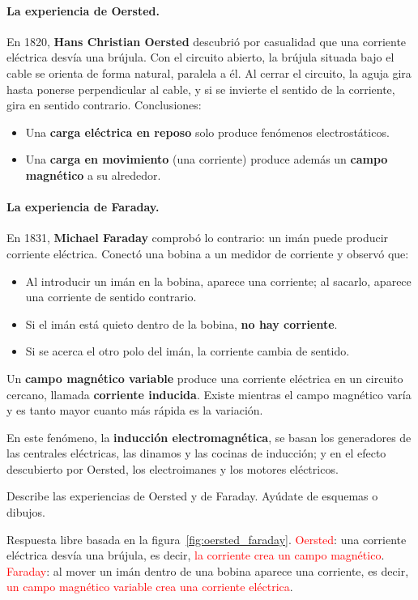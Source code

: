 \paragraph{La experiencia de Oersted.} En 1820, \textbf{Hans Christian Oersted} descubrió por casualidad que una corriente eléctrica desvía una brújula. Con el circuito abierto, la brújula situada bajo el cable se orienta de forma natural, paralela a él. Al cerrar el circuito, la aguja gira hasta ponerse perpendicular al cable, y si se invierte el sentido de la corriente, gira en sentido contrario. Conclusiones:
\begin{itemize}
    \item Una \textbf{carga eléctrica en reposo} solo produce fenómenos electrostáticos.
    \item Una \textbf{carga en movimiento} (una corriente) produce además un \textbf{campo magnético} a su alrededor.
\end{itemize}

\paragraph{La experiencia de Faraday.} En 1831, \textbf{Michael Faraday} comprobó lo contrario: un imán puede producir corriente eléctrica. Conectó una bobina a un medidor de corriente y observó que:
\begin{itemize}
    \item Al introducir un imán en la bobina, aparece una corriente; al sacarlo, aparece una corriente de sentido contrario.
    \item Si el imán está quieto dentro de la bobina, \textbf{no hay corriente}.
    \item Si se acerca el otro polo del imán, la corriente cambia de sentido.
\end{itemize}

\begin{definition}
    Un \textbf{campo magnético variable} produce una corriente eléctrica en un circuito cercano, llamada \textbf{corriente inducida}. Existe mientras el campo magnético varía y es tanto mayor cuanto más rápida es la variación.
\end{definition}

En este fenómeno, la \textbf{inducción electromagnética}, se basan los generadores de las centrales eléctricas, las dinamos y las cocinas de inducción; y en el efecto descubierto por Oersted, los electroimanes y los motores eléctricos.

\begin{exercise}
    Describe las experiencias de Oersted y de Faraday. Ayúdate de esquemas o dibujos.
    \begin{solu}
        Respuesta libre basada en la figura~\ref{fig:oersted_faraday}. \textcolor{red}{Oersted}: una corriente eléctrica desvía una brújula, es decir, \textcolor{red}{la corriente crea un campo magnético}. \textcolor{red}{Faraday}: al mover un imán dentro de una bobina aparece una corriente, es decir, \textcolor{red}{un campo magnético variable crea una corriente eléctrica}.
    \end{solu}
\end{exercise}
